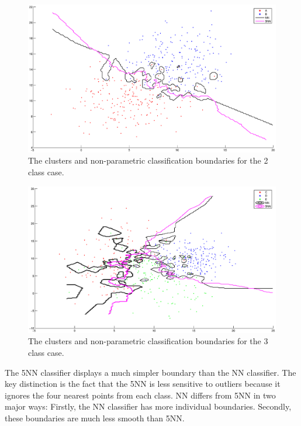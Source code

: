 \begin{figure}
  \begin{center}
  	\label{fig:2nonparam}  
    \caption{The clusters and non-parametric classification
    boundaries for the 2 class case.}
    \includegraphics[width=15cm]{figures/2-nonparam}
  \end{center}
\end{figure}

\begin{figure}
  \begin{center}
  	\label{fig:3nonparam}
    \caption{The clusters and non-parametric classification
    boundaries for the 3 class case.}
    \includegraphics[width=15cm]{figures/3-nonparam}
  \end{center}
\end{figure}

The 5NN classifier displays a much simpler 
boundary than the NN classifier.  The key distinction is the fact that the 5NN is  less sensitive to 
outliers because it ignores the four nearest points from each class.
NN differs from 5NN in two major ways: Firstly, the NN classifier has more individual boundaries. Secondly, these boundaries are much 
less smooth than 5NN.

